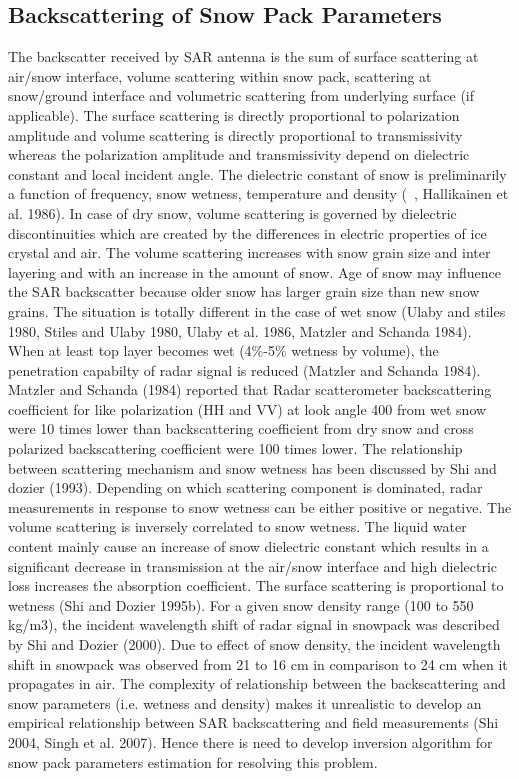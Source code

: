 \subsection{Backscattering of Snow Pack Parameters}
The backscatter received by SAR antenna is the sum of surface scattering at air/snow interface, volume scattering within snow pack, scattering at snow/ground interface and volumetric scattering from underlying surface (if applicable). The surface scattering is directly proportional to polarization amplitude and volume scattering is directly proportional to transmissivity whereas the polarization amplitude and transmissivity depend on dielectric constant and local incident angle. The dielectric constant of snow is preliminarily a function of frequency, snow wetness, temperature and density (~\cite{ulaby1986microwave}, Hallikainen et al. 1986). In case of dry snow, volume scattering is governed by dielectric discontinuities which are created by the differences in electric properties of ice crystal and air. The volume scattering increases with snow grain size and inter layering and with an increase in the amount of snow. Age of snow may influence the SAR backscatter because older snow has larger grain size than new snow grains.
The situation is totally different in the case of wet snow (Ulaby and stiles 1980, Stiles and Ulaby 1980, Ulaby et al. 1986, Matzler and Schanda 1984). When at least top layer becomes wet (4$\%$-5$\%$ wetness by volume), the penetration capabilty of radar signal is reduced (Matzler and Schanda 1984). Matzler and Schanda (1984) reported that Radar scatterometer backscattering coefficient for like polarization (HH and VV) at look angle 400 from wet snow were 10 times lower than backscattering coefficient from dry snow and cross polarized backscattering coefficient were 100 times lower. The relationship between scattering mechanism and snow wetness has been discussed by Shi and dozier (1993).  Depending on which scattering component is dominated, radar measurements in response to snow wetness can be either positive or negative. The volume scattering is inversely correlated to snow wetness. The liquid water content mainly cause an increase of snow dielectric constant which results in a significant decrease in transmission at the air/snow interface and  high dielectric loss increases the absorption coefficient. The surface scattering is proportional to wetness (Shi and Dozier 1995b). For a given snow density range (100 to 550 kg/m3), the incident wavelength shift of radar signal in snowpack was described by Shi and Dozier (2000). Due to effect of snow density, the incident wavelength shift in snowpack was observed from 21 to 16 cm in comparison to 24 cm when it propagates in air. The complexity of relationship between the backscattering and snow parameters (i.e. wetness and density) makes it unrealistic to develop an empirical relationship between SAR backscattering and field measurements (Shi 2004, Singh et al. 2007). Hence there is need to develop inversion algorithm for snow pack parameters estimation for resolving this problem.   
